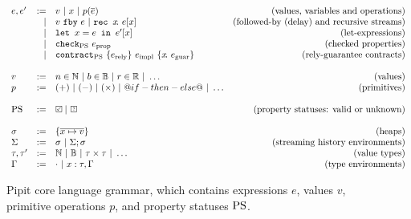 
\begin{figure}
  \[
  \begin{array}{lrlr}
    e, e' & := & v ~|~ x ~|~ p(\ov{e}) & \mbox{(values, variables and operations)} \\
          & | & \xfby{v}{e} ~|~ \xrec{x}{e[x]} & \mbox{(followed-by (delay) and recursive streams)} \\ %
          & | & \xlet{x}{e}{e'[x]} & \mbox{(let-expressions)}\\
          & | & \xcheckP{\PStatus}{e_{\text{prop}}} & \mbox{(checked properties)} \\
          & | & \xcontractP{\PStatus}{\erely}{\eimpl}{x\!.~\eguar} & \mbox{(rely-guarantee contracts)} \\
    \\
    v & := & n \in \mathbb{N} ~|~ b \in \mathbb{B} ~|~ r \in \mathbb{R} ~|~ \hdots  & \mbox{(values)} \\
    p & := & (+) ~|~ (-) ~|~ (\times) ~|~ @if-then-else@ ~|~ \hdots & \mbox{(primitives)} \\
    \\
    \PStatus & := & \PSValid ~|~ \PSUnknown & \mbox{(property statuses: valid or unknown)}\\
    \\
    \sigma & := & \sgl{\ov{x \mapsto v}} & \mbox{(heaps)} \\
    \Sigma & := & \sigma ~|~ \Sigma;\sigma & \mbox{(streaming history environments)} \\
    \tau, \tau' & := & \mathbb{N} ~|~ \mathbb{B} ~|~ \tau \times \tau ~|~ \hdots & \mbox{(value types)} \\
    \Gamma & := & \cdot ~|~ x : \tau, \Gamma & \mbox{(type environments)}  \\
    \end{array}
  \]
  \caption{Pipit core language grammar, which contains expressions $e$, values $v$, primitive operations $p$, and property statuses $\text{PS}$.}
  \label{f:core-grammar}
\end{figure}